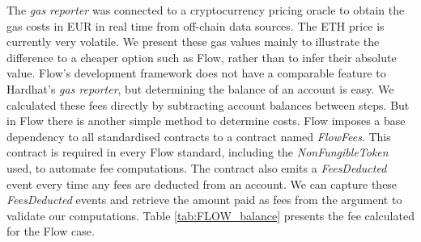\documentclass[../NFTComp_IEEE.tex]{subfiles}
\begin{document}
The \textit{gas reporter} was connected to a cryptocurrency pricing oracle to obtain the gas costs in EUR in real time from off-chain data sources. The ETH price is currently very volatile. We present these gas values mainly to illustrate the difference to a cheaper option such as Flow, rather than to infer their absolute value. Flow's development framework does not have a comparable feature to Hardhat's \textit{gas reporter}, but determining the balance of an account is easy. We calculated these fees directly by subtracting account balances between steps. But in Flow there is another simple method to determine costs. Flow imposes a base dependency to all standardised contracts to a contract named \textit{FlowFees}. This contract is required in every Flow standard, including the \textit{NonFungibleToken} used, to automate fee computations. The contract also emits a \textit{FeesDeducted} event every time any fees are deducted from an account. We can capture these \textit{FeesDeducted} events and retrieve the amount paid as fees from the argument to validate our computations. Table \ref{tab:FLOW_balance} presents the fee calculated for the Flow case.
\end{document}
